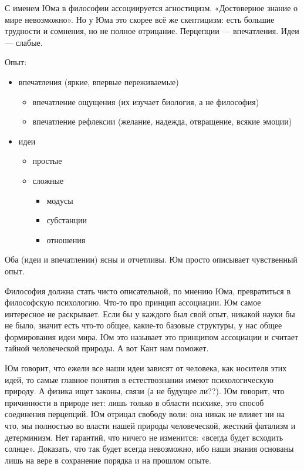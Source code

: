 С именем Юма в философии ассоциируется агностицизм. «Достоверное знание о мире невозможно». Но у Юма это скорее всё же скептицизм: есть большие трудности и сомнения, но не полное отрицание. 
Перцепции --- впечатления. Идеи --- слабые.

Опыт:
\begin{itemize}
	\item впечатления (яркие, впервые переживаемые)
	\begin{itemize}
		\item впечатление ощущения (их изучает биология, а не философия)
		\item впечатление рефлексии (желание, надежда, отвращение, всякие эмоции)
	\end{itemize}
	\item идеи 
	\begin{itemize}
		\item простые 
		\item сложные
		\begin{itemize}
			\item модусы
			\item субстанции
			\item отношения
		\end{itemize}
	\end{itemize}
\end{itemize}
Оба (идеи и впечатлении) ясны и отчетливы. Юм просто описывает чувственный опыт. 

Философия должна стать чисто описательной, по мнению Юма, превратиться в философскую психологию. Что-то про принцип ассоциации. Юм самое интересное не раскрывает. Если бы у каждого был свой опыт, никакой науки бы не было, значит есть что-то общее, какие-то базовые структуры, у нас общее формирования идеи мира. Юм это называет это принципом ассоциации и считает тайной человеческой природы. А вот Кант нам поможет.

Юм говорит, что ежели все наши идеи зависят от человека, как носителя этих идей, то самые главное понятия в естествознании имеют психологическую природу. А физика ищет законы, связи (а не будущее ли??). Юм говорит, что причинности в природе нет: лишь только в области психике, это способ соединения перцепций. Юм отрицал свободу воли: она никак не влияет ни на что, мы полностью во власти нашей природы человеческой, жесткий фатализм и детерминизм. Нет гарантий, что ничего не изменится: «всегда будет всходить солнце». Доказать, что так будет всегда невозможно, ибо наши знания основаны лишь на вере в сохранение порядка и на прошлом опыте. 